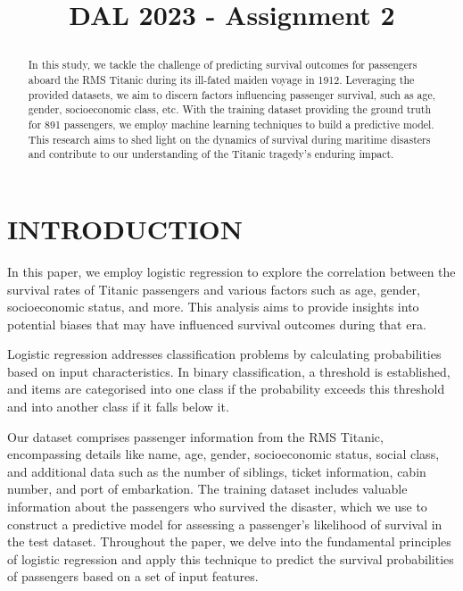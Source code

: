 \documentclass[conference]{IEEEtran}
\begin{document}
\pagestyle{plain}

\title{DAL 2023 - Assignment 2\\
{\footnotesize}

}

\author{
}

\maketitle

\begin{abstract}
In this study, we tackle the challenge of predicting survival outcomes for passengers aboard the RMS Titanic during its ill-fated maiden voyage in 1912. Leveraging the provided datasets, we aim to discern factors influencing passenger survival, such as age, gender, socioeconomic class, etc. With the training dataset providing the ground truth for 891 passengers, we employ machine learning techniques to build a predictive model. This research aims to shed light on the dynamics of survival during maritime disasters and contribute to our understanding of the Titanic tragedy’s enduring impact.
\end{abstract}
\vspace{1mm} %

\section{INTRODUCTION}

In this paper, we employ logistic regression to explore the correlation between the survival rates of Titanic passengers and various factors such as age, gender, socioeconomic status, and more. This analysis aims to provide insights into potential biases that may have influenced survival outcomes during that era. 

Logistic regression addresses classification problems by calculating probabilities based on input characteristics. In binary classification, a threshold is established, and items are categorised into one class if the probability exceeds this threshold and into another class if it falls below it. 

Our dataset comprises passenger information from the RMS Titanic, encompassing details like name, age, gender, socioeconomic status, social class, and additional data such as the number of siblings, ticket information, cabin number, and port of embarkation. The training dataset includes valuable information about the passengers who survived the disaster, which we use to construct a predictive model for assessing a passenger’s likelihood of survival in the test dataset. Throughout the paper, we delve into the fundamental principles of logistic regression and apply this technique to predict the survival probabilities of passengers based on a set of input features.
\end{document}
